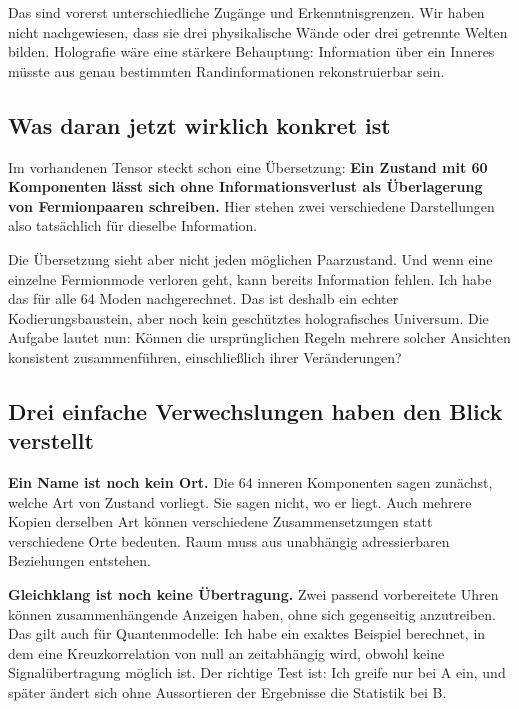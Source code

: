 \documentclass[
  ngerman,
  10pt,
  a4paper,
]{article}
\begin{document}
Das sind vorerst unterschiedliche Zugänge und Erkenntnisgrenzen. Wir
haben nicht nachgewiesen, dass sie drei physikalische Wände oder drei
getrennte Welten bilden. Holografie wäre eine stärkere Behauptung:
Information über ein Inneres müsste aus genau bestimmten
Randinformationen rekonstruierbar sein.

\subsection{Was daran jetzt wirklich konkret
ist}\label{was-daran-jetzt-wirklich-konkret-ist}

Im vorhandenen Tensor steckt schon eine Übersetzung: \textbf{Ein Zustand
mit 60 Komponenten lässt sich ohne Informationsverlust als Überlagerung
von Fermionpaaren schreiben.} Hier stehen zwei verschiedene
Darstellungen also tatsächlich für dieselbe Information.

Die Übersetzung sieht aber nicht jeden möglichen Paarzustand. Und wenn
eine einzelne Fermionmode verloren geht, kann bereits Information
fehlen. Ich habe das für alle 64 Moden nachgerechnet. Das ist deshalb
ein echter Kodierungsbaustein, aber noch kein geschütztes holografisches
Universum. Die Aufgabe lautet nun: Können die ursprünglichen Regeln
mehrere solcher Ansichten konsistent zusammenführen, einschließlich
ihrer Veränderungen?

\subsection{Drei einfache Verwechslungen haben den Blick
verstellt}\label{drei-einfache-verwechslungen-haben-den-blick-verstellt}

\textbf{Ein Name ist noch kein Ort.} Die 64 inneren Komponenten sagen
zunächst, welche Art von Zustand vorliegt. Sie sagen nicht, wo er liegt.
Auch mehrere Kopien derselben Art können verschiedene Zusammensetzungen
statt verschiedene Orte bedeuten. Raum muss aus unabhängig
adressierbaren Beziehungen entstehen.

\textbf{Gleichklang ist noch keine Übertragung.} Zwei passend
vorbereitete Uhren können zusammenhängende Anzeigen haben, ohne sich
gegenseitig anzutreiben. Das gilt auch für Quantenmodelle: Ich habe ein
exaktes Beispiel berechnet, in dem eine Kreuzkorrelation von null an
zeitabhängig wird, obwohl keine Signalübertragung möglich ist. Der
richtige Test ist: Ich greife nur bei A ein, und später ändert sich ohne
Aussortieren der Ergebnisse die Statistik bei B.
\end{document}
